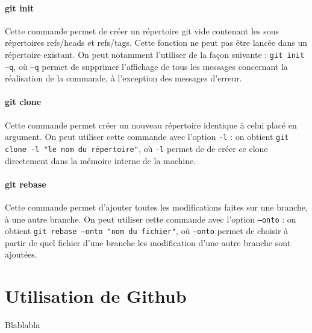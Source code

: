 \documentclass[11pt,canadien]{article}
\begin{document}
\paragraph{git init}Cette commande permet de créer un répertoire git vide contenant les sous répertoires refs/heads et refs/tags. Cette fonction ne peut pas être lancée dans un répertoire existant. On peut notamment l’utiliser de la façon suivante : \texttt{git init –q}, où \texttt{–q} permet de supprimer l’affichage de tous les messages concernant la réalisation de la commande, à l’exception des messages d’erreur.

\paragraph{git clone}Cette commande permet créer un nouveau répertoire identique à celui placé en argument. On peut utiliser cette commande avec l’option \texttt{-l} : on obtient \texttt{git clone -l "le nom du répertoire"}, où \texttt{-l} permet de de créer ce clone directement dans la mémoire interne de la machine.

\paragraph{git rebase}Cette commande permet d'ajouter toutes les modifications faites sur une branche, à une autre branche. On peut utiliser cette commande avec l'option \texttt{–onto} : on obtient \texttt{git rebase –onto "nom du fichier"}, où \texttt{–onto} permet de choisir à partir de quel fichier d'une branche les modification d'une autre branche sont ajoutées.


\section{Utilisation de Github}
Blablabla
\end{document}
